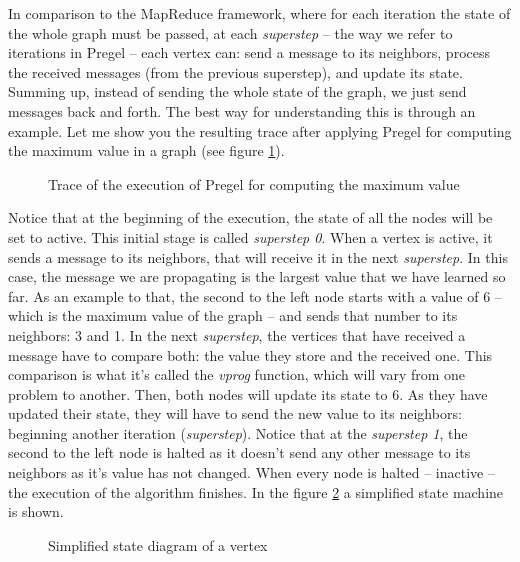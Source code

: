 In comparison to the MapReduce framework, where for each iteration the state of the whole graph must be passed, at each \textit{superstep} -- the way we refer to iterations in Pregel -- each vertex can: send a message to its neighbors, process the received messages (from the previous superstep), and update its state. Summing up, instead of sending the whole state of the graph, we just send messages back and forth. The best way for understanding this is through an example. Let me show you the resulting trace after applying Pregel for computing the maximum value in a graph (see figure \ref{fig:pregel}).

\begin{figure}[h]
    \centering
    
    \caption[Trace of the execution of Pregel for computing the maximum value]{Trace of the execution of Pregel for computing the maximum value~\cite{10.1145/1807167.1807184}}
    \label{fig:pregel}
\end{figure}

Notice that at the beginning of the execution, the state of all the nodes will be set to active. This initial stage is called \textit{superstep 0}. When a vertex is active, it sends a message to its neighbors, that will receive it in the next \textit{superstep}. In this case, the message we are propagating is the largest value that we have learned so far. As an example to that, the second to the left node starts with a value of 6 -- which is the maximum value of the graph -- and sends that number to its neighbors: 3 and 1. In the next \textit{superstep}, the vertices that have received a message have to compare both: the value they store and the received one. This comparison is what it's called the \textit{vprog} function, which will vary from one problem to another. Then, both nodes will update its state to 6. As they have updated their state, they will have to send the new value to its neighbors: beginning another iteration (\textit{superstep}). Notice that at the \textit{superstep 1}, the second to the left node is halted as it doesn't send any other message to its neighbors as it's value has not changed. When every node is halted -- inactive -- the execution of the algorithm finishes. In the figure \ref{fig:state} a simplified state machine is shown.

\begin{figure}[h]
    \centering
    
    \caption[Simplified state diagram of a vertex]{Simplified state diagram of a vertex~\cite{10.1145/1807167.1807184}}
    \label{fig:state}
\end{figure}

